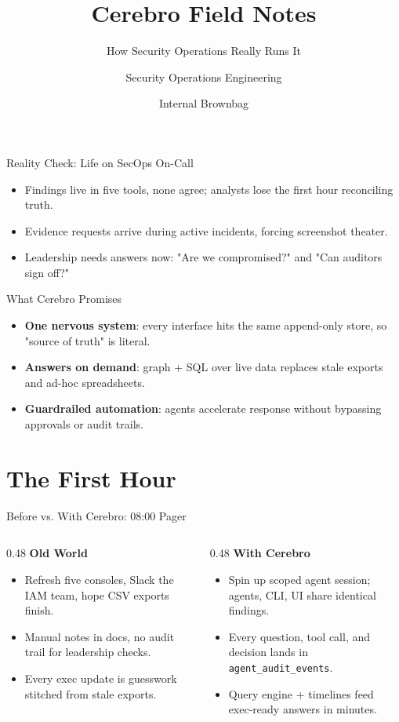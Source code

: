 \documentclass[aspectratio=169]{beamer}
\title{Cerebro Field Notes}
\subtitle{How Security Operations Really Runs It}
\author{Security Operations Engineering}
\date{Internal Brownbag}
\begin{document}
\begin{frame}
  \titlepage
\end{frame}
\begin{frame}{Reality Check: Life on SecOps On-Call}
  \begin{itemize}
    \item Findings live in five tools, none agree; analysts lose the first hour reconciling truth.
    \item Evidence requests arrive during active incidents, forcing screenshot theater.
    \item Leadership needs answers now: "Are we compromised?" and "Can auditors sign off?"
  \end{itemize}
\end{frame}

\begin{frame}{What Cerebro Promises}
  \begin{itemize}
    \item \textbf{One nervous system}: every interface hits the same append-only store, so "source of truth" is literal.
    \item \textbf{Answers on demand}: graph + SQL over live data replaces stale exports and ad-hoc spreadsheets.
    \item \textbf{Guardrailed automation}: agents accelerate response without bypassing approvals or audit trails.
  \end{itemize}
\end{frame}

\section{The First Hour}

\begin{frame}{Before vs. With Cerebro: 08:00 Pager}
  \begin{columns}[T,onlytextwidth]
    \begin{column}{0.48\textwidth}
      \textbf{Old World}
      \begin{itemize}
        \item Refresh five consoles, Slack the IAM team, hope CSV exports finish.
        \item Manual notes in docs, no audit trail for leadership checks.
        \item Every exec update is guesswork stitched from stale exports.
      \end{itemize}
    \end{column}
    \begin{column}{0.48\textwidth}
      \textbf{With Cerebro}
      \begin{itemize}
        \item Spin up scoped agent session; agents, CLI, UI share identical findings.
        \item Every question, tool call, and decision lands in \texttt{agent\_audit\_events}.
        \item Query engine + timelines feed exec-ready answers in minutes.
      \end{itemize}
    \end{column}
  \end{columns}
\end{frame}
\end{document}
